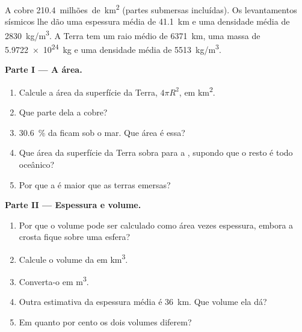 \begin{problem}
\label{pb:g12:continental-crust:1}
A  cobre \num{210.4}~milhões~de~\unit{km^2} (partes
submersas incluídas). Os levantamentos sísmicos lhe dão uma espessura média
de \qty{41.1}{km} e uma densidade média de \qty{2830}{kg/m^3}. A Terra tem
um raio médio de \qty{6371}{km}, uma massa de \qty{5.9722e24}{kg} e uma
densidade média de \qty{5513}{kg/m^3}.

\medskip
\noindent\textbf{Parte I --- A área.}
\begin{enumerate}
  \item Calcule a área da superfície da Terra, $4\pi R^2$, em
        \unit{km^2}.
  \item Que parte dela a  cobre?
  \item \qty{30.6}{\percent} da  ficam sob o mar. Que área
        é essa?
  \item Que área da superfície da Terra sobra para a ,
        supondo que o resto é todo oceânico?
  \item Por que a  é maior que as terras emersas?
\end{enumerate}

\medskip
\noindent\textbf{Parte II --- Espessura e volume.}
\begin{enumerate}[resume]
  \item Por que o volume pode ser calculado como área vezes espessura,
        embora a crosta fique sobre uma esfera?
  \item Calcule o volume da  em \unit{km^3}.
  \item Converta-o em \unit{m^3}.
  \item Outra estimativa da espessura média é \qty{36}{km}. Que volume ela
        dá?
  \item Em quanto por cento os dois volumes diferem?
\end{enumerate}


\end{problem}
